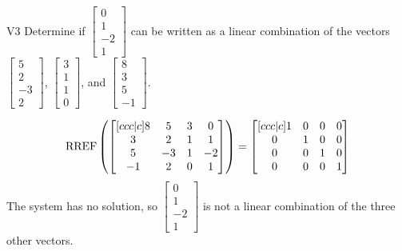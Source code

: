 \begin{problem}{V3}
Determine if \(\begin{bmatrix} 0 \\ 1 \\ -2 \\ 1 \end{bmatrix}\) can be written as a linear combination of the vectors \(\begin{bmatrix} 5 \\ 2 \\ -3 \\ 2 \end{bmatrix}\), \(\begin{bmatrix} 3 \\ 1 \\ 1 \\ 0 \end{bmatrix}\), and \(\begin{bmatrix} 8 \\ 3 \\ 5 \\ -1 \end{bmatrix}\).
\end{problem}
\begin{solution}

\[\operatorname{RREF} \left(\begin{bmatrix}[ccc|c] 8 & 5 & 3 & 0\\ 3 & 2 & 1 & 1 \\ 5 & -3 & 1 & -2  \\ -1 & 2 & 0 & 1 \end{bmatrix} \right) = \begin{bmatrix}[ccc|c] 1 & 0 & 0 & 0  \\ 0 &  1 & 0 & 0  \\ 0 & 0 & 1 & 0 \\ 0 & 0 & 0 & 1  \end{bmatrix}\]
The system has no solution, so \(\begin{bmatrix} 0 \\ 1 \\ -2 \\ 1 \end{bmatrix}\) is not a linear combination of the three other vectors.
\end{solution}



